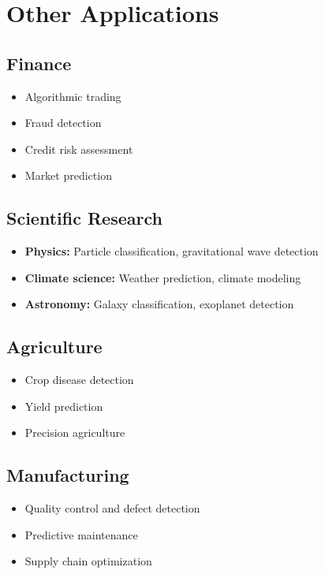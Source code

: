 
\section{Other Applications}
\label{sec:other-applications}

\subsection{Finance}

\begin{itemize}
    \item Algorithmic trading
    \item Fraud detection
    \item Credit risk assessment
    \item Market prediction
\end{itemize}

\subsection{Scientific Research}

\begin{itemize}
    \item \textbf{Physics:} Particle classification, gravitational wave detection
    \item \textbf{Climate science:} Weather prediction, climate modeling
    \item \textbf{Astronomy:} Galaxy classification, exoplanet detection
\end{itemize}

\subsection{Agriculture}

\begin{itemize}
    \item Crop disease detection
    \item Yield prediction
    \item Precision agriculture
\end{itemize}

\subsection{Manufacturing}

\begin{itemize}
    \item Quality control and defect detection
    \item Predictive maintenance
    \item Supply chain optimization
\end{itemize}

